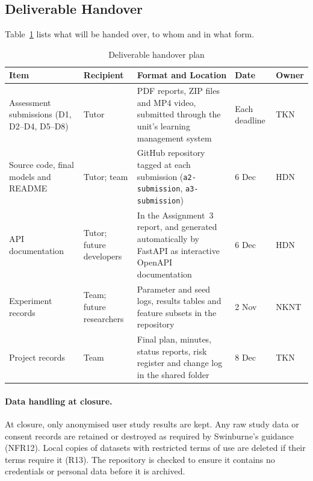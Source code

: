 \subsection{Deliverable Handover}\label{sec:handover}

Table~\ref{tab:handover} lists what will be handed over, to whom and in what form.

\begin{table}[htbp]
\centering
\caption{Deliverable handover plan}
\label{tab:handover}
\begin{tabularx}{\textwidth}{@{}>{\raggedright\arraybackslash}p{} >{\raggedright\arraybackslash}p{} >{\raggedright\arraybackslash}X l l@{}}
  \toprule
  \textbf{Item} & \textbf{Recipient} & \textbf{Format and Location} & \textbf{Date} & \textbf{Owner} \\
  \midrule
  Assessment submissions (D1, D2--D4, D5--D8) & Tutor & PDF reports, ZIP files and MP4 video, submitted through the unit's learning management system & Each deadline & TKN \\
  \addlinespace
  Source code, final models and README & Tutor; team & GitHub repository tagged at each submission (\texttt{a2-submission}, \texttt{a3-submission}) & 6 Dec & HDN \\
  \addlinespace
  API documentation & Tutor; future developers & In the Assignment~3 report, and generated automatically by FastAPI as interactive OpenAPI documentation & 6 Dec & HDN \\
  \addlinespace
  Experiment records & Team; future researchers & Parameter and seed logs, results tables and feature subsets in the repository & 2 Nov & NKNT \\
  \addlinespace
  Project records & Team & Final plan, minutes, status reports, risk register and change log in the shared folder & 8 Dec & TKN \\
  \bottomrule
\end{tabularx}
\end{table}

\paragraph{Data handling at closure.} At closure, only anonymised user study results are kept. Any raw study data or consent records are retained or destroyed as required by Swinburne's guidance (NFR12). Local copies of datasets with restricted terms of use are deleted if their terms require it (R13). The repository is checked to ensure it contains no credentials or personal data before it is archived.

